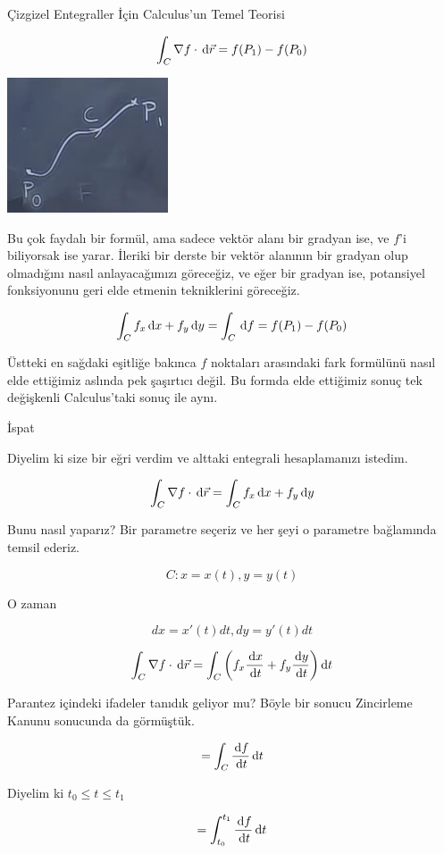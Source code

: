 \documentclass[12pt,fleqn]{article}\usepackage{../../common}
\begin{document}
Çizgizel Entegraller İçin Calculus'un Temel Teorisi

$$
\int_{C} \nabla f \cdot \,\mathrm{d}\vec{r} = 
f(P_1) - f(P_0)
$$

\begin{center}
\includegraphics[height=4cm]{20_5.png}
\end{center}

Bu çok faydalı bir formül, ama sadece vektör alanı bir gradyan ise, ve $f$'i
biliyorsak ise yarar. İleriki bir derste bir vektör alanının bir gradyan olup
olmadığını nasıl anlayacağımızı göreceğiz, ve eğer bir gradyan ise, potansiyel
fonksiyonunu geri elde etmenin tekniklerini göreceğiz.

$$ \int_C f_x \,\mathrm{d} x + f_y \,\mathrm{d} y  = \int_C \,\mathrm{d} f = f(P_1) - f(P_0) $$

Üstteki en sağdaki eşitliğe bakınca $f$ noktaları arasındaki fark formülünü
nasıl elde ettiğimiz aslında pek şaşırtıcı değil. Bu formda elde ettiğimiz
sonuç tek değişkenli Calculus'taki sonuç ile aynı. 

İspat

Diyelim ki size bir eğri verdim ve alttaki entegrali hesaplamanızı
istedim. 

$$
\int_{C} \nabla f \cdot \,\mathrm{d}\vec{r} =  \int_C f_x \,\mathrm{d} x + f_y \,\mathrm{d} y
$$

Bunu nasıl yaparız? Bir parametre seçeriz ve her şeyi o parametre
bağlamında temsil ederiz. 

$$ C: x = x(t), y = y(t) $$

O zaman 

$$ dx = x'(t)dt, dy = y'(t)dt $$

$$
\int_{C} \nabla f \cdot \,\mathrm{d}\vec{r} =  
\int_C \bigg( f_x \frac{\,\mathrm{d} x}{\,\mathrm{d} t} + f_y \frac{\,\mathrm{d} y}{\,\mathrm{d} t} \bigg) \,\mathrm{d} t
$$

Parantez içindeki ifadeler tanıdık geliyor mu? Böyle bir sonucu Zincirleme
Kanunu sonucunda da görmüştük. 

$$ = \int_C \frac{\,\mathrm{d} f}{\,\mathrm{d} t} \,\mathrm{d} t $$

Diyelim ki $t_0 \le t \le t_1$

$$ = \int_{t_0}^{t_1} \frac{\,\mathrm{d} f}{\,\mathrm{d} t} \,\mathrm{d} t$$
\end{document}
